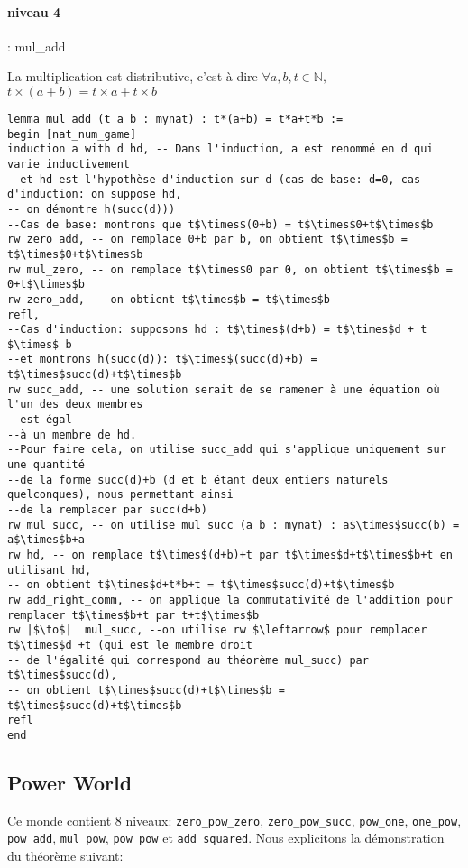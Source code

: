\paragraph{niveau 4} :  mul\_add  \begin{center} La multiplication est distributive, c'est à dire  $\forall a, b, t \in \mathbb{N},$  $t\times(a+b)=t\times a+t\times b $ \end{center}
\begin{verbatim}
lemma mul_add (t a b : mynat) : t*(a+b) = t*a+t*b :=
begin [nat_num_game]
induction a with d hd, -- Dans l'induction, a est renommé en d qui varie inductivement 
--et hd est l'hypothèse d'induction sur d (cas de base: d=0, cas d'induction: on suppose hd, 
-- on démontre h(succ(d)))   
--Cas de base: montrons que t$\times$(0+b) = t$\times$0+t$\times$b
rw zero_add, -- on remplace 0+b par b, on obtient t$\times$b = t$\times$0+t$\times$b 
rw mul_zero, -- on remplace t$\times$0 par 0, on obtient t$\times$b = 0+t$\times$b 
rw zero_add, -- on obtient t$\times$b = t$\times$b
refl,
--Cas d'induction: supposons hd : t$\times$(d+b) = t$\times$d + t $\times$ b
--et montrons h(succ(d)): t$\times$(succ(d)+b) = t$\times$succ(d)+t$\times$b 
rw succ_add, -- une solution serait de se ramener à une équation où l'un des deux membres 
--est égal 
--à un membre de hd. 
--Pour faire cela, on utilise succ_add qui s'applique uniquement sur une quantité 
--de la forme succ(d)+b (d et b étant deux entiers naturels quelconques), nous permettant ainsi 
--de la remplacer par succ(d+b)
rw mul_succ, -- on utilise mul_succ (a b : mynat) : a$\times$succ(b) = a$\times$b+a
rw hd, -- on remplace t$\times$(d+b)+t par t$\times$d+t$\times$b+t en utilisant hd, 
-- on obtient t$\times$d+t*b+t = t$\times$succ(d)+t$\times$b
rw add_right_comm, -- on applique la commutativité de l'addition pour remplacer t$\times$b+t par t+t$\times$b
rw |$\to$|  mul_succ, --on utilise rw $\leftarrow$ pour remplacer t$\times$d +t (qui est le membre droit
-- de l'égalité qui correspond au théorème mul_succ) par t$\times$succ(d), 
-- on obtient t$\times$succ(d)+t$\times$b = t$\times$succ(d)+t$\times$b
refl
end
\end{verbatim}
\subsection{Power World}
Ce monde contient 8 niveaux: \texttt{zero\_pow\_zero}, \texttt{zero\_pow\_succ}, \texttt{pow\_one}, \texttt{one\_pow}, \texttt{pow\_add}, \texttt{mul\_pow}, \texttt{pow\_pow} et \texttt{add\_squared}.
Nous explicitons la démonstration du théorème suivant:\\
